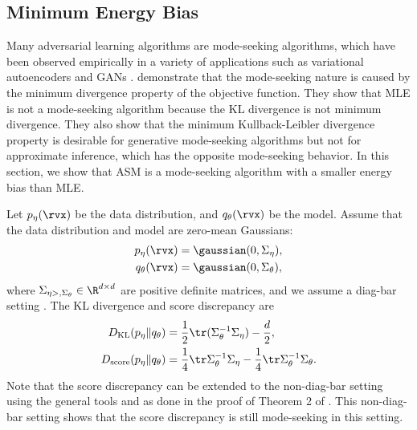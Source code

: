 \subsection{Minimum Energy Bias}
\label{sec:energy_bias}
Many adversarial learning algorithms are mode-seeking algorithms, which have been observed empirically in a variety of applications such as variational autoencoders \citep{Burda2016} and GANs \citep{Goodfellow2014a}. \citet{TingLi2023} demonstrate that the mode-seeking nature is caused by the minimum divergence property of the objective function. They show that MLE is not a mode-seeking algorithm because the KL divergence is not minimum divergence. They also show that the minimum Kullback-Leibler divergence property is desirable for generative mode-seeking algorithms but not for approximate inference, which has the opposite mode-seeking behavior. In this section, we show that ASM is a mode-seeking algorithm with a smaller energy bias than MLE.

Let $p_{\eta}(\rvx)$ be the data distribution, and $q_{\theta}(\rvx)$ be the model. Assume that the data distribution and model are zero-mean Gaussians:
\begin{align*}
	p_{\eta}(\rvx) &= \gaussian(0, \Sigma_{\eta}), \\
    q_{\theta}(\rvx) &= \gaussian(0, \Sigma_{\theta}),
\end{align*}
where $\Sigma_{\eta>, \Sigma_{\theta}} \in \R^{d \times d}$ are positive definite matrices, and we assume a diag-bar setting \citep{Wainwright2019}. The KL divergence and score discrepancy are 
\begin{align*}
	D_{\text{KL}}(p_{\eta} \| q_{\theta}) &= \frac{1}{2} \tr(\Sigma_{\theta}^{-1} \Sigma_{\eta}) - \frac{d}{2}, \\
    D_{\text{score}}(p_{\eta} \| q_{\theta}) &= \frac{1}{4} \tr \Sigma_{\theta}^{-1} \Sigma_{\eta} - \frac{1}{4} \tr \Sigma_{\theta}^{-1} \Sigma_{\theta}.
\end{align*}
Note that the score discrepancy can be extended to the non-diag-bar setting using the general tools \citep{Vershynin2018} and \citep{Wainwright2019} as done in the proof of Theorem 2 of \citet{TingLi2023}. This non-diag-bar setting shows that the score discrepancy is still mode-seeking in this setting.


